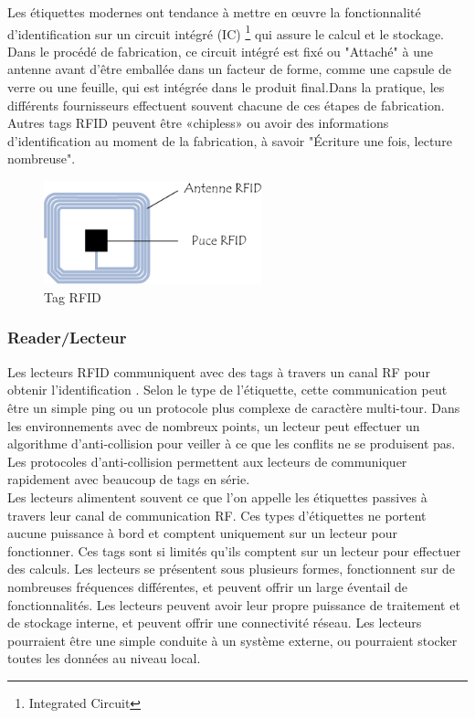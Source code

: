 \documentclass[11pt, a4paper, twoside]{book}
\begin{document}
Les étiquettes modernes ont tendance à mettre en œuvre la fonctionnalité d'identification sur un circuit intégré (IC) \footnote{Integrated Circuit} qui
assure le calcul et le stockage. Dans le procédé de fabrication, ce circuit intégré est fixé ou
"Attaché" à une antenne avant d'être emballée dans un facteur de forme, comme une capsule de verre ou une feuille, qui est intégrée dans le produit final.Dans la pratique, les différents fournisseurs effectuent souvent chacune de ces étapes de fabrication. Autres tags RFID peuvent être «chipless» ou avoir des informations d'identification au moment de la fabrication, à savoir
"Écriture une fois, lecture nombreuse". \\
\begin{figure}[H]
\centering
\includegraphics[height=3cm]{tag}
\caption{Tag RFID}
\end{figure}
\subsubsection{Reader/Lecteur}
Les lecteurs RFID communiquent avec des tags à travers un canal RF pour obtenir l'identification
. Selon le type de l'étiquette, cette communication peut être un simple ping ou un protocole plus complexe de caractère multi-tour. Dans les environnements avec de nombreux points, un lecteur peut effectuer un algorithme d'anti-collision pour veiller à ce que les conflits ne se produisent pas. Les protocoles d'anti-collision permettent aux lecteurs de communiquer rapidement avec beaucoup de tags en série.\\

Les lecteurs alimentent souvent ce que l'on appelle les étiquettes passives à travers leur canal de communication RF.
Ces types d'étiquettes ne portent aucune puissance à bord et comptent uniquement sur un lecteur pour fonctionner. Ces tags sont si limités qu'ils comptent sur un lecteur pour effectuer des calculs.
Les lecteurs se présentent sous plusieurs formes, fonctionnent sur de nombreuses fréquences différentes, et peuvent offrir un large éventail de fonctionnalités. Les lecteurs peuvent avoir leur propre puissance de traitement et de stockage interne, et peuvent offrir une connectivité réseau. Les lecteurs pourraient être une simple conduite à un système externe, ou pourraient stocker toutes les données  au niveau local.\\
\end{document}
